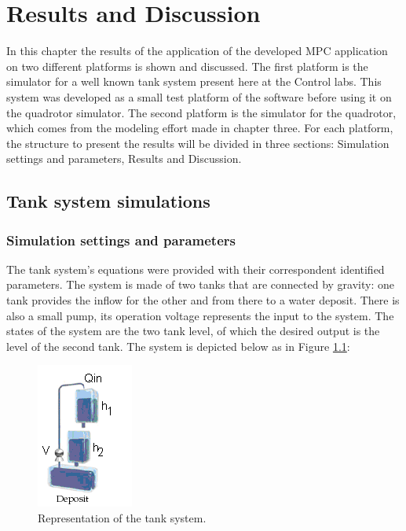 \chapter{Results and Discussion}
\label{chap:Results_and_Discussion}

In this chapter the results of the application of the developed MPC application on two different platforms is shown and discussed. The first platform is the simulator for a well known tank system present here at the Control labs. This system was developed as a small test platform of the software before using it on the quadrotor simulator. The second platform is the simulator for the quadrotor, which comes from the modeling effort made in chapter three. For each platform, the structure to present the results will be divided in three sections: Simulation settings and parameters, Results and Discussion.

\section{Tank system simulations}

\subsection{Simulation settings and parameters}

The tank system's equations were provided with their correspondent identified parameters. The system is made of two tanks that are connected by gravity: one tank provides the inflow for the other and from there to a water deposit. There is also a small pump, its operation voltage represents the input to the system. The states of the system are the two tank level, of which the desired output is the level of the second  tank.  The system is depicted below as in Figure \ref{fig:tank_system}: 

\begin{figure}[H]
\centering
\includegraphics[scale=0.7]{Images/Chapter5/tank_system.png}
\caption{Representation of the tank system.}
\label{fig:tank_system}
\end{figure}

